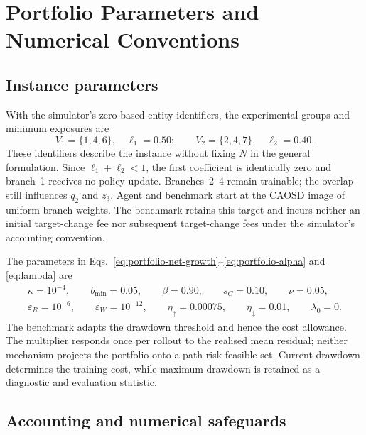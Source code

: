\documentclass[10pt]{article}
\begin{document}
\section{Portfolio Parameters and Numerical Conventions}
\label{app:instance}

\subsection{Instance parameters}

With the simulator's zero-based entity identifiers, the experimental groups and minimum exposures are
\begin{equation}
  V_1=\{1,4,6\},\quad \ell_1=0.50;\qquad
  V_2=\{2,4,7\},\quad \ell_2=0.40.
  \label{eq:portfolio-groups}
\end{equation}
These identifiers describe the instance without fixing $N$ in the general formulation. Since $\ell_1+\ell_2<1$, the first coefficient is identically zero and branch~1 receives no policy update. Branches~2--4 remain trainable; the overlap still influences $q_2$ and $z_3$. Agent and benchmark start at the CAOSD image of uniform branch weights. The benchmark retains this target and incurs neither an initial target-change fee nor subsequent target-change fees under the simulator's accounting convention.

The parameters in Eqs.~\eqref{eq:portfolio-net-growth}--\eqref{eq:portfolio-alpha} and \eqref{eq:lambda} are
\begin{equation}
  \begin{gathered}
    \kappa=10^{-4},\qquad b_{\min}=0.05,\qquad
    \beta=0.90,\qquad s_C=0.10,\qquad \nu=0.05,\\
    \varepsilon_R=10^{-6},\qquad \varepsilon_W=10^{-12},\qquad
    \eta_\uparrow=0.00075,\qquad\eta_\downarrow=0.01,\qquad\lambda_0=0.
  \end{gathered}
  \label{eq:instance-parameters}
\end{equation}
The benchmark adapts the drawdown threshold and hence the cost allowance. The multiplier responds once per rollout to the realised mean residual; neither mechanism projects the portfolio onto a path-risk-feasible set. Current drawdown determines the training cost, while maximum drawdown is retained as a diagnostic and evaluation statistic.

\subsection{Accounting and numerical safeguards}
\end{document}
